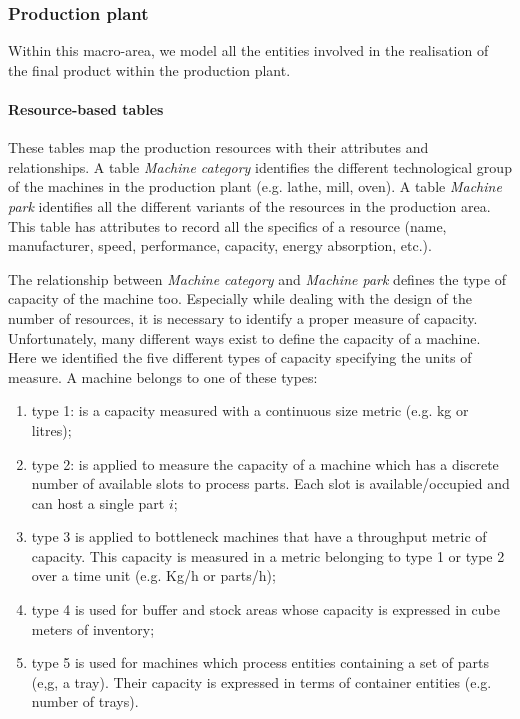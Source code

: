 \subsubsection{Production plant}
Within this macro-area, we model all the entities involved in the realisation of the final product within the production plant.

\paragraph{Resource-based tables}
These tables map the production resources with their attributes and relationships. A table \textit{Machine category} identifies the different technological group of the machines in the production plant (e.g. lathe, mill, oven). A table \textit{Machine park} identifies all the different variants of the resources in the production area. This table has attributes to record all the specifics of a resource (name, manufacturer, speed, performance, capacity, energy absorption, etc.). \par

The relationship between \textit{Machine category} and \textit{Machine park} defines the type of capacity of the machine too. Especially while dealing with the design of the number of resources, it is necessary to identify a proper measure of capacity. Unfortunately, many different ways exist to define the capacity of a machine. Here we identified the five different types of capacity specifying the units of measure. A machine belongs to one of these types:

\begin{enumerate}
    \item type 1: is a capacity measured with a continuous size metric (e.g. kg or litres);
    \item type 2: is applied to measure the capacity of a machine which has a discrete number of available slots to process parts. Each slot is available/occupied and can host a single part $i$;
    \item type 3 is applied to bottleneck machines that have a throughput metric of capacity. This capacity is measured in a metric belonging to type 1 or type 2 over a time unit (e.g. Kg/h or parts/h);
    \item type 4 is used for buffer and stock areas whose capacity is expressed in cube meters of inventory;
    \item type 5 is used for machines which process entities containing a set of parts (e,g, a tray). Their capacity is expressed in terms of container entities (e.g. number of trays).
\end{enumerate}

